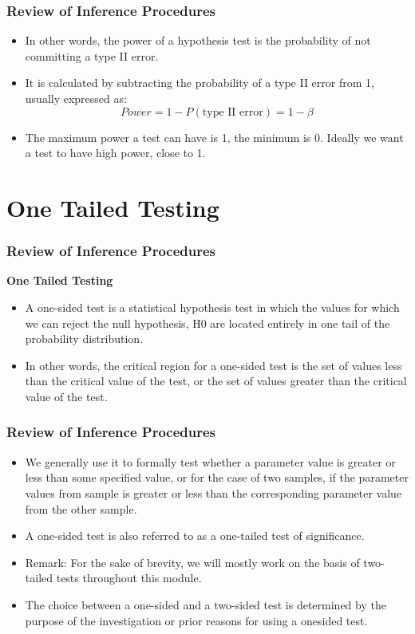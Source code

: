 \documentclass{beamer}
\begin{document}
\begin{frame}
\frametitle{Review of Inference Procedures}
\large
\begin{itemize}
\item In other words, the power of a hypothesis test is the probability of
				not committing a type II error. 
\item It is calculated by subtracting the
				probability of a type II error from 1, usually expressed as:
				\[Power = 1 - P(\mbox{type II error}) = 1- \beta\]
\item The maximum power a test can have is 1, the minimum is 0. Ideally
				we want a test to have high power, close to 1.
\end{itemize}
\end{frame}
\section{One Tailed Testing}

\begin{frame}
\frametitle{Review of Inference Procedures}
\large
\noindent \textbf{One Tailed Testing}
\begin{itemize}
				\item A one-sided test is a statistical hypothesis test in which the values
				for which we can reject the null hypothesis, H0 are located entirely
				in one tail of the probability distribution.
				\item In other words, the critical region for a one-sided test is the set of
				values less than the critical value of the test, or the set of values
				greater than the critical value of the test.
\end{itemize}
			
			
\end{frame}
\begin{frame}
			\frametitle{Review of Inference Procedures}
			\large
			\begin{itemize}
				\item We generally use it to formally test whether a parameter value is
				greater or less than some specified value, or for the case of two
				samples, if the parameter values from sample is greater or less
				than the corresponding parameter value from the other sample.
				\item A one-sided test is also referred to as a one-tailed test of
				significance.
				\item Remark: For the sake of brevity, we will mostly work on the basis of two-tailed tests throughout this module.
				\item The choice between a one-sided and a two-sided test is determined
				by the purpose of the investigation or prior reasons for using a onesided
				test.
			\end{itemize}
			
			
		\end{frame}
\end{document}
